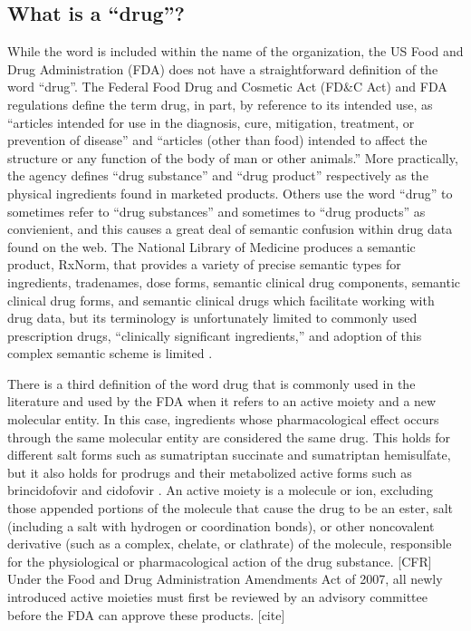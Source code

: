 \documentclass{bioinfo}
\begin{document}
\subsection{What is a ``drug''?}
While the word is included within the name of the organization, the US Food and Drug Administration (FDA) does not have a straightforward definition of the word ``drug''. The Federal Food Drug and Cosmetic Act (FD\&C Act) and FDA regulations define the term drug, in part, by reference to its intended use, as ``articles intended for use in the diagnosis, cure, mitigation, treatment, or prevention of disease” and “articles (other than food) intended to affect the structure or any function of the body of man or other animals.'' \citep{FDADrug}
More practically, the agency defines ``drug substance'' and ``drug product'' respectively as the physical ingredients found in marketed products. Others use the word ``drug'' to sometimes refer to ``drug substances'' and sometimes to ``drug products'' as convienient, and this causes a great deal of semantic confusion within drug data found on the web. The National Library of Medicine produces a semantic product, RxNorm, that provides a variety of precise semantic types for ingredients, tradenames, dose forms, semantic clinical drug components, semantic clinical drug forms, and semantic clinical drugs which facilitate working with drug data, but its terminology is unfortunately limited to commonly used prescription drugs, ``clinically significant ingredients,'' and adoption of this complex semantic scheme is limited \citep{RxNorm2020}.

There is a third definition of the word drug that is commonly used in the literature and used by the FDA when it refers to an active moiety and a new molecular entity. In this case, ingredients whose pharmacological effect occurs through the same molecular entity are considered the same drug. This holds for different salt forms such as sumatriptan succinate and sumatriptan hemisulfate, but it also holds for prodrugs and their metabolized active forms such as brincidofovir and cidofovir \citep{NME2020}. An active moiety is a molecule or ion, excluding those appended portions of the molecule that cause the drug to be an ester, salt (including a salt with hydrogen or coordination bonds), or other noncovalent derivative (such as a complex, chelate, or clathrate) of the molecule, responsible for the physiological or pharmacological action of the drug substance. [CFR] Under the Food and Drug Administration Amendments Act of 2007, all newly introduced active moieties must first be reviewed by an advisory committee before the FDA can approve these products. [cite]
\end{document}
